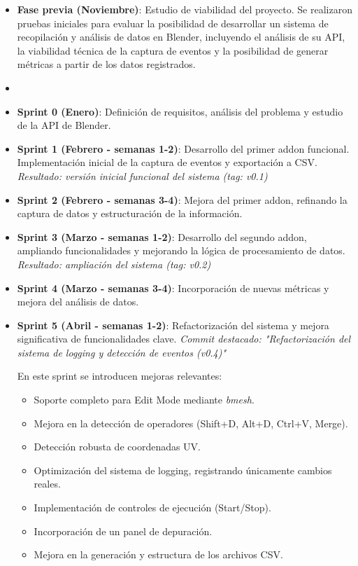 \begin{itemize}
    \item \textbf{Fase previa (Noviembre)}: Estudio de viabilidad del proyecto. Se realizaron pruebas iniciales para evaluar la posibilidad de desarrollar un sistema de recopilación y análisis de datos en Blender, incluyendo el análisis de su API, la viabilidad técnica de la captura de eventos y la posibilidad de generar métricas a partir de los datos registrados.
    \item 
    \item \textbf{Sprint 0 (Enero)}: Definición de requisitos, análisis del problema y estudio de la API de Blender.

    \item \textbf{Sprint 1 (Febrero - semanas 1-2)}: Desarrollo del primer addon funcional. Implementación inicial de la captura de eventos y exportación a CSV.
    \textit{Resultado: versión inicial funcional del sistema (tag: v0.1)}

    \item \textbf{Sprint 2 (Febrero - semanas 3-4)}: Mejora del primer addon, refinando la captura de datos y estructuración de la información.  

    \item \textbf{Sprint 3 (Marzo - semanas 1-2)}: Desarrollo del segundo addon, ampliando funcionalidades y mejorando la lógica de procesamiento de datos.
    \textit{Resultado: ampliación del sistema (tag: v0.2)}

    \item \textbf{Sprint 4 (Marzo - semanas 3-4)}: Incorporación de nuevas métricas y mejora del análisis de datos.  
    

    \item \textbf{Sprint 5 (Abril - semanas 1-2)}: Refactorización del sistema y mejora significativa de funcionalidades clave.  
    \textit{Commit destacado: "Refactorización del sistema de logging y detección de eventos (v0.4)"}  

    En este sprint se introducen mejoras relevantes:
    \begin{itemize}
        \item Soporte completo para Edit Mode mediante \textit{bmesh}.
        \item Mejora en la detección de operadores (Shift+D, Alt+D, Ctrl+V, Merge).
        \item Detección robusta de coordenadas UV.
        \item Optimización del sistema de logging, registrando únicamente cambios reales.
        \item Implementación de controles de ejecución (Start/Stop).
        \item Incorporación de un panel de depuración.
        \item Mejora en la generación y estructura de los archivos CSV.
    \end{itemize}


\end{itemize}
